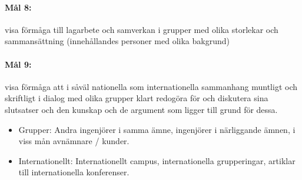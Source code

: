 % 
% 

\paragraph{Mål 8:} visa förmåga till lagarbete och samverkan i grupper
med olika storlekar och sammansättning (innehållandes personer med
olika bakgrund)

% 
% 

\paragraph{Mål 9:} visa förmåga att i såväl nationella som
internationella sammanhang muntligt och skriftligt i dialog med olika
grupper klart redogöra för och diskutera sina slutsatser och den
kunskap och de argument som ligger till grund för dessa.
\begin{itemize}
\item Grupper: Andra ingenjörer i samma ämne, ingenjörer i närliggande
  ämnen, i viss mån avnämnare / kunder.
\item Internationellt: Internationellt campus, internationella
  grupperingar, artiklar till internationella konferenser.
\end{itemize}

% 
% 
% 

